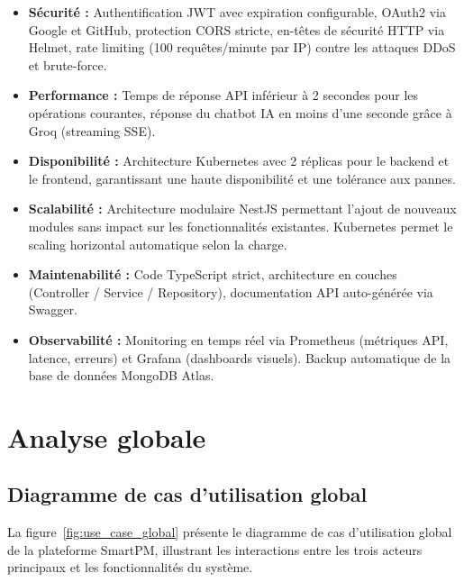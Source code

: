 \begin{itemize}
  \item \textbf{Sécurité :} Authentification JWT avec expiration configurable, OAuth2 via Google
  et GitHub, protection CORS stricte, en-têtes de sécurité HTTP via Helmet, rate limiting
  (100 requêtes/minute par IP) contre les attaques DDoS et brute-force.

  \item \textbf{Performance :} Temps de réponse API inférieur à 2 secondes pour les opérations
  courantes, réponse du chatbot IA en moins d'une seconde grâce à Groq (streaming SSE).

  \item \textbf{Disponibilité :} Architecture Kubernetes avec 2 réplicas pour le backend et
  le frontend, garantissant une haute disponibilité et une tolérance aux pannes.

  \item \textbf{Scalabilité :} Architecture modulaire NestJS permettant l'ajout de nouveaux
  modules sans impact sur les fonctionnalités existantes. Kubernetes permet le scaling horizontal
  automatique selon la charge.

  \item \textbf{Maintenabilité :} Code TypeScript strict, architecture en couches (Controller /
  Service / Repository), documentation API auto-générée via Swagger.

  \item \textbf{Observabilité :} Monitoring en temps réel via Prometheus (métriques API,
  latence, erreurs) et Grafana (dashboards visuels). Backup automatique de la base de données
  MongoDB Atlas.
\end{itemize}


\section{Analyse globale}
\label{sec:analyse_globale}

\subsection{Diagramme de cas d'utilisation global}

La figure~\ref{fig:use_case_global} présente le diagramme de cas d'utilisation global de la
plateforme SmartPM, illustrant les interactions entre les trois acteurs principaux et les
fonctionnalités du système.

